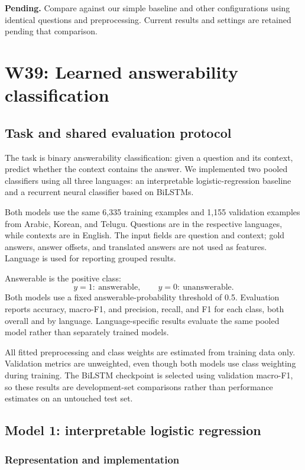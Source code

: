 \documentclass[11pt,a4paper]{article}
\begin{document}
\textbf{Pending.} Compare against our simple baseline and other configurations using identical questions and preprocessing. Current results and settings are retained pending that comparison.

\section{W39: Learned answerability classification}

\subsection{Task and shared evaluation protocol}

The task is binary answerability classification: given a question and its
context, predict whether the context contains the answer. We implemented
two pooled classifiers using all three languages: an interpretable
logistic-regression baseline and a recurrent neural classifier based on
BiLSTMs.

Both models use the same 6,335 training examples and 1,155 validation
examples from Arabic, Korean, and Telugu. Questions are in the respective
languages, while contexts are in English. The input fields are question
and context; gold answers, answer offsets, and translated answers are
not used as features. Language is used for reporting grouped results.

Answerable is the positive class:
\[
y=1:\ \text{answerable},
\qquad
y=0:\ \text{unanswerable}.
\]
Both models use a fixed answerable-probability threshold of 0.5.
Evaluation reports accuracy, macro-F1, and precision, recall, and F1
for each class, both overall and by language. Language-specific results
evaluate the same pooled model rather than separately trained models.

All fitted preprocessing and class weights are estimated from training
data only. Validation metrics are unweighted, even though both models
use class weighting during training. The BiLSTM checkpoint is selected
using validation macro-F1, so these results are development-set
comparisons rather than performance estimates on an untouched test set.


\subsection{Model 1: interpretable logistic regression}

\subsubsection{Representation and implementation}
\end{document}

